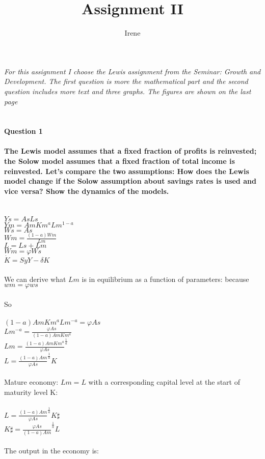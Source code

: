\documentclass[10pnt]{article}
\author{Irene}
\title{Assignment II}
\begin{document}
\textit{For this assignment I choose the Lewis assignment from the Seminar: Growth and Development. The first question is more the mathematical part and the second question includes more text and three graphs. The figures are shown on the last page}
		\\
		\\
		\\
\textbf{Question 1} 
		\\
		\\
\textbf{The Lewis model assumes that a fixed fraction of profits is reinvested; the Solow model assumes that a fixed fraction of total income is reinvested. Let’s compare the two assumptions: How does the Lewis model change if the Solow assumption about savings rates is used and vice versa? Show the dynamics of the models.}  
	\\
	\\
	\\
	$Ys=AsLs$
	\\
	$Ym=AmKm^aLm^{1-a}$
	\\
	$Ws=As$
	\\
	$Wm=
	\frac{(1-a)Wm}{Lm}
	$
	\\
	$L=Ls+Lm$
	\\
	$Wm=\varphi{Ws}$
	\\
	$\dot{K}= SyY-\delta{K}$
	\\
	\\
	We can derive what $Lm$ is in equilibrium as a function of parameters: 
	because $wm=\varphi{w}s$
	\\
	\\
	So
	\\
	\\
	$(1-a)AmKm^aLm^{-a}= \varphi{A}s$
	\\
	$Lm^{-a}=\frac{\varphi{As}}{(1-a)AmKm^{a}}$
	\\
	$Lm=
	\frac{(1-a)AmKm^a}{\varphi{As}}^{\frac{1}{a}}
	$
	\\
	$L=
	\frac{(1-a)Am}{\varphi{As}}^\frac{1}{a}K
	$
	\\
	\\
	Mature economy: $Lm=L$ with a corresponding capital level at the start of maturity level K:
	\\
	\\
	$L=
	\frac{(1-a)Am}{\varphi{As}}^\frac{1}{a}K\sharp
	$
	\\
	$K\sharp=
	\frac{\varphi{As}}{(1-a)Am}^\frac{1}{a}L
	$
	\\
	\\
	The output in the economy is:
	\\
\end{document}
